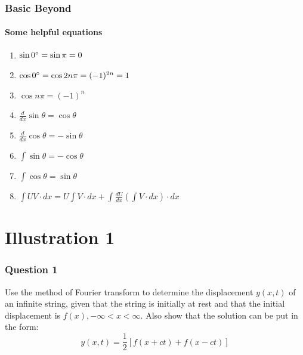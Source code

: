 \documentclass[9 pt]{beamer}
\begin{document}
\begin{frame}
	\frametitle{Basic Beyond}
	\framesubtitle{Some helpful equations}
	\begin{enumerate}

		\item<+-| alert@+> $\sin 0\degree = \sin \pi = 0$
		\item<+-| alert@+> $\cos 0\degree = \cos 2n\pi = (-1)^{2n} = 1$
		\item<+-| alert@+> $\cos n\pi = (-1)^n$
		\item<+-| alert@+> $\frac{d}{dx} \sin\theta = \cos\theta$
		\item<+-| alert@+> $\frac{d}{dx} \cos\theta = -\sin\theta$
		\item<+-| alert@+> $\int \sin\theta = -\cos\theta$
		\item<+-| alert@+> $\int \cos\theta = \sin\theta$
		\item<+-| alert@+> $\int UV\cdot dx=U\int V\cdot dx+\int \frac{dU}{dx}(\int V\cdot dx)\cdot dx$

	\transfade[duration=0.15]
	\end{enumerate}
\end{frame}


\section{Illustration 1}


\begin{frame}[fragile]
	\frametitle{Question 1}
	\begin{block}{1}
		Use the method of Fourier transform to determine the displacement $y(x, t)$ of an infinite string, given that the string is initially at rest and that the initial displacement is $f(x), -\infty < x < \infty$. Also show that the solution can be put in the form:
		\begin{displaymath}
			y(x, t)=\frac{1}{2}\left[f(x+ct)+f(x-ct)\right]
		\end{displaymath}
	\end{block}
	\transwipe[duration=0.6]
\end{frame}
\end{document}
